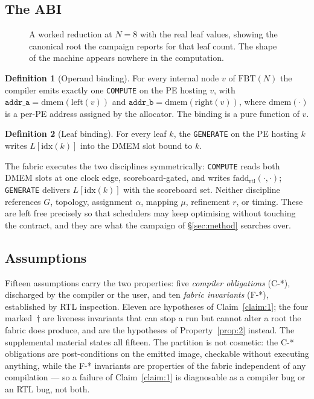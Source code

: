 \documentclass[journal,10pt]{IEEEtran}
\theoremstyle{plain}
\theoremstyle{definition}
\newtheorem{definition}{Definition}
\theoremstyle{remark}
\newcommand{\FBT}{\ensuremath{\mathrm{FBT}}}
\newcommand{\fadd}{\ensuremath{\mathrm{fadd}_{\mathrm{rtl}}}}
\newcommand{\asgn}{\ensuremath{\alpha}}
\newcommand{\map}{\ensuremath{\mu}}
\begin{document}
\subsection{The ABI}\label{sec:abi-def}

\begin{figure}[!t]\centering

\caption{A worked reduction at $N{=}8$ with the real leaf values, showing the canonical root the campaign reports for that leaf count. The shape of the machine appears nowhere in the computation.}\label{fig:worked}
\end{figure}


\begin{definition}[Operand binding]\label{def:opbind}
For every internal node $v$ of $\FBT(N)$ the compiler emits exactly one
\texttt{COMPUTE} on the PE hosting $v$, with
$\mathtt{addr\_a} = \mathrm{dmem}(\mathrm{left}(v))$ and
$\mathtt{addr\_b} = \mathrm{dmem}(\mathrm{right}(v))$, where
$\mathrm{dmem}(\cdot)$ is a per-PE address assigned by the allocator. The
binding is a pure function of $v$.
\end{definition}

\begin{definition}[Leaf binding]\label{def:leafbind}
For every leaf $k$, the \texttt{GENERATE} on the PE hosting $k$ writes
$L[\mathrm{idx}(k)]$ into the DMEM slot bound to $k$.
\end{definition}

The fabric executes the two disciplines symmetrically: \texttt{COMPUTE} reads
both DMEM slots at one clock edge, scoreboard-gated, and writes
$\fadd(\cdot,\cdot)$; \texttt{GENERATE} delivers $L[\mathrm{idx}(k)]$ with the
scoreboard set. Neither discipline references $G$, topology, assignment
$\asgn$, mapping $\map$, refinement $r$, or timing. These are left free
precisely so that schedulers may keep optimising without touching the
contract, and they are what the campaign of \S\ref{sec:method} searches over.

\subsection{Assumptions}\label{sec:abi-assumptions}

Fifteen assumptions carry the two properties: five \emph{compiler obligations}
(\textsf{C-*}), discharged by the compiler or the user, and ten \emph{fabric
invariants} (\textsf{F-*}), established by RTL inspection. Eleven are
hypotheses of Claim~\ref{claim:1}; the four marked~$\dagger$ are liveness
invariants that can stop a run but cannot alter a root the fabric does
produce, and are the hypotheses of Property~\ref{prop:2} instead.
The supplemental material states all fifteen. The partition is not
cosmetic: the \textsf{C-*} obligations are post-conditions on the emitted
image, checkable without executing anything, while the \textsf{F-*} invariants
are properties of the fabric independent of any compilation --- so a failure
of Claim~\ref{claim:1} is diagnosable as a compiler bug or an RTL bug, not
both.
\end{document}
